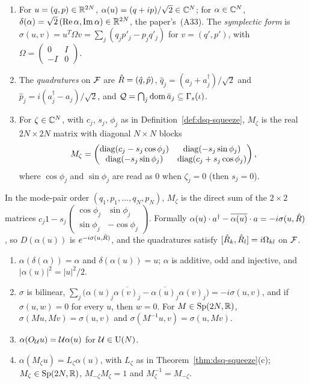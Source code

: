 \begin{veteenv}
\begin{definition}\label{def:gu-coords}
\begin{enumerate}
\item[(a)] For $u=(q,p)\in\mathbb R^{2N}$, $\alpha(u)=(q+ip)/\sqrt2\in\mathbb C^N$; for $\alpha\in\mathbb C^N$,
$\delta(\alpha)=\sqrt2\,(\operatorname{Re}\alpha,\operatorname{Im}\alpha)\in\mathbb R^{2N}$, the paper's~(A33). The \emph{symplectic form} is
$\sigma(u,v)=u^T\Omega v=\sum_j(q_jp'_j-p_jq'_j)$ for $v=(q',p')$, with $\Omega=\left(\begin{smallmatrix}0&I\\-I&0\end{smallmatrix}\right)$.
\item[(b)] The \emph{quadratures} on $\mathcal F$ are $\hat R=(\hat q,\hat p)$, $\hat q_j=(a_j+a_j^\dagger)/\sqrt2$ and
$\hat p_j=i(a_j^\dagger-a_j)/\sqrt2$, and $\mathcal Q=\bigcap_j\operatorname{dom}\bar a_j\subseteq\Gamma_s(\iota)$.
\item[(c)] For $\zeta\in\mathbb C^N$, with $c_j$, $s_j$, $\phi_j$ as in Definition~\ref{def:dsq-squeeze}, $M_\zeta$ is the real $2N\times2N$ matrix
with diagonal $N\times N$ blocks
\[
 M_\zeta=\begin{pmatrix}\operatorname{diag}(c_j-s_j\cos\phi_j)&\operatorname{diag}(-s_j\sin\phi_j)\\ \operatorname{diag}(-s_j\sin\phi_j)&\operatorname{diag}(c_j+s_j\cos\phi_j)\end{pmatrix},
\]
where $\cos\phi_j$ and $\sin\phi_j$ are read as $0$ when $\zeta_j=0$ (then $s_j=0$).
\end{enumerate}
\end{definition}

In the mode-pair order $(q_1,p_1,\ldots,q_N,p_N)$, $M_\zeta$ is the direct sum of the $2\times2$ matrices
$c_j1-s_j\left(\begin{smallmatrix}\cos\phi_j&\sin\phi_j\\\sin\phi_j&-\cos\phi_j\end{smallmatrix}\right)$. Formally
$\alpha(u)\cdot a^\dagger-\overline{\alpha(u)}\cdot a=-i\sigma(u,\hat R)$, so $D(\alpha(u))$ is $e^{-i\sigma(u,\hat R)}$, and the quadratures
satisfy $[\hat R_k,\hat R_l]=i\Omega_{kl}$ on $\mathcal F$.

\begin{lemma}\label{lem:gu-coords}
\begin{enumerate}
\item[(a)] $\alpha(\delta(\alpha))=\alpha$ and $\delta(\alpha(u))=u$; $\alpha$ is additive, odd and injective, and
$\lvert\alpha(u)\rvert^2=\lvert u\rvert^2/2$.
\item[(b)] $\sigma$ is bilinear, $\sum_j\bigl(\alpha(u)_j\overline{\alpha(v)_j}-\overline{\alpha(u)_j}\alpha(v)_j\bigr)=-i\sigma(u,v)$, and if
$\sigma(u,w)=0$ for every $u$, then $w=0$. For $M\in\mathrm{Sp}(2N,\mathbb R)$, $\sigma(Mu,Mv)=\sigma(u,v)$ and $\sigma(M^{-1}u,v)=\sigma(u,Mv)$.
\item[(c)] $\alpha(O_\mathcal U u)=\mathcal U\alpha(u)$ for $\mathcal U\in\mathrm{U}(N)$.
\item[(d)] $\alpha(M_\zeta u)=L_\zeta\alpha(u)$, with $L_\zeta$ as in Theorem~\ref{thm:dsq-squeeze}(c); $M_\zeta\in\mathrm{Sp}(2N,\mathbb R)$, $M_{-\zeta}M_\zeta=1$
and $M_\zeta^{-1}=M_{-\zeta}$.
\end{enumerate}
\end{lemma}


\end{veteenv}

